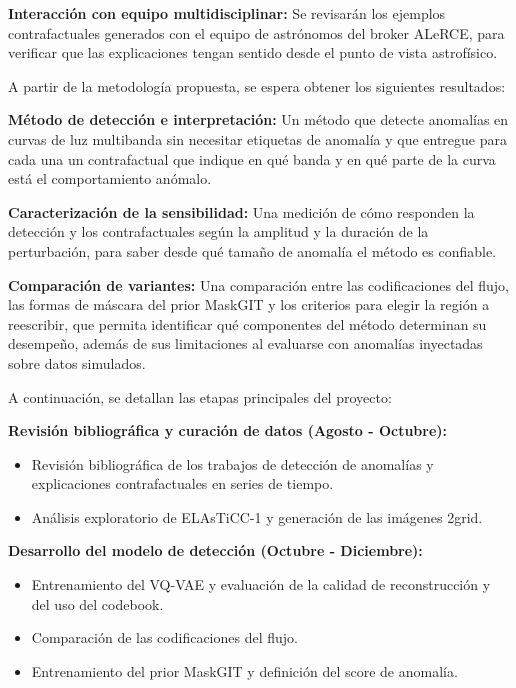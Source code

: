 \documentclass[11pt]{article}
\newcommand{\seccion}[1]{\vspace{6pt}\noindent{\large\textbf{$\bullet$ #1}}\par\vspace{2pt}}
\begin{document}
\textbf{Interacción con equipo multidisciplinar:} Se revisarán los ejemplos contrafactuales generados con el equipo de astrónomos del broker ALeRCE, para verificar que las explicaciones tengan sentido desde el punto de vista astrofísico.

\seccion{Resultados Esperados}

A partir de la metodología propuesta, se espera obtener los siguientes resultados:

\textbf{Método de detección e interpretación:} Un método que detecte anomalías en curvas de luz multibanda sin necesitar etiquetas de anomalía y que entregue para cada una un contrafactual que indique en qué banda y en qué parte de la curva está el comportamiento anómalo.

\textbf{Caracterización de la sensibilidad:} Una medición de cómo responden la detección y los contrafactuales según la amplitud y la duración de la perturbación, para saber desde qué tamaño de anomalía el método es confiable.

\textbf{Comparación de variantes:} Una comparación entre las codificaciones del flujo, las formas de máscara del prior MaskGIT y los criterios para elegir la región a reescribir, que permita identificar qué componentes del método determinan su desempeño, además de sus limitaciones al evaluarse con anomalías inyectadas sobre datos simulados.

\seccion{Plan de Trabajo}

A continuación, se detallan las etapas principales del proyecto:

\textbf{Revisión bibliográfica y curación de datos (Agosto - Octubre):}
\begin{itemize}
    \item Revisión bibliográfica de los trabajos de detección de anomalías y explicaciones contrafactuales en series de tiempo.
    \item Análisis exploratorio de ELAsTiCC-1 y generación de las imágenes 2grid.
\end{itemize}

\textbf{Desarrollo del modelo de detección (Octubre - Diciembre):}
\begin{itemize}
    \item Entrenamiento del VQ-VAE y evaluación de la calidad de reconstrucción y del uso del codebook.
    \item Comparación de las codificaciones del flujo.
    \item Entrenamiento del prior MaskGIT y definición del score de anomalía.
\end{itemize}
\end{document}
